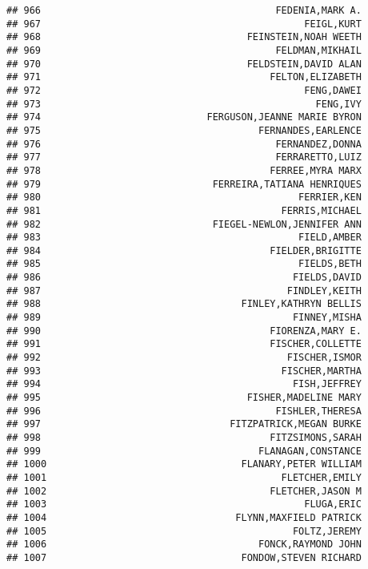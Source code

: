 \documentclass[
]{article}
\begin{document}
\begin{verbatim}
## 966                                         FEDENIA,MARK A.
## 967                                              FEIGL,KURT
## 968                                    FEINSTEIN,NOAH WEETH
## 969                                         FELDMAN,MIKHAIL
## 970                                    FELDSTEIN,DAVID ALAN
## 971                                        FELTON,ELIZABETH
## 972                                              FENG,DAWEI
## 973                                                FENG,IVY
## 974                             FERGUSON,JEANNE MARIE BYRON
## 975                                      FERNANDES,EARLENCE
## 976                                         FERNANDEZ,DONNA
## 977                                         FERRARETTO,LUIZ
## 978                                        FERREE,MYRA MARX
## 979                              FERREIRA,TATIANA HENRIQUES
## 980                                             FERRIER,KEN
## 981                                          FERRIS,MICHAEL
## 982                              FIEGEL-NEWLON,JENNIFER ANN
## 983                                             FIELD,AMBER
## 984                                        FIELDER,BRIGITTE
## 985                                             FIELDS,BETH
## 986                                            FIELDS,DAVID
## 987                                           FINDLEY,KEITH
## 988                                   FINLEY,KATHRYN BELLIS
## 989                                            FINNEY,MISHA
## 990                                        FIORENZA,MARY E.
## 991                                        FISCHER,COLLETTE
## 992                                           FISCHER,ISMOR
## 993                                          FISCHER,MARTHA
## 994                                            FISH,JEFFREY
## 995                                    FISHER,MADELINE MARY
## 996                                         FISHLER,THERESA
## 997                                 FITZPATRICK,MEGAN BURKE
## 998                                        FITZSIMONS,SARAH
## 999                                      FLANAGAN,CONSTANCE
## 1000                                  FLANARY,PETER WILLIAM
## 1001                                         FLETCHER,EMILY
## 1002                                       FLETCHER,JASON M
## 1003                                             FLUGA,ERIC
## 1004                                 FLYNN,MAXFIELD PATRICK
## 1005                                           FOLTZ,JEREMY
## 1006                                     FONCK,RAYMOND JOHN
## 1007                                  FONDOW,STEVEN RICHARD

\end{verbatim}
\end{document}
